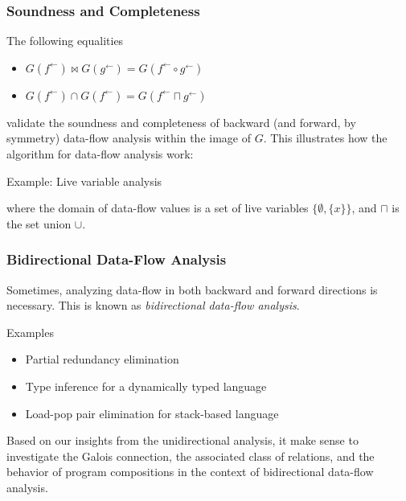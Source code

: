 \documentclass{beamer}
\newcommand{\fb}{{f^{\leftarrow}}}
\newcommand{\gb}{{g^{\leftarrow}}}
\newcommand{\meet}{\sqcap}
\newcommand{\comp}{\circ}
\begin{document}
\begin{frame}
  \frametitle{Soundness and Completeness}
  The following equalities
  \begin{itemize}
    \item $G(\fb) \bowtie G(\gb) = G(\fb \comp \gb)$
    \item $G(\fb) \cap G(\fb) = G(\fb \meet \gb)$
  \end{itemize}
  validate the soundness and completeness of backward (and forward, by symmetry) data-flow analysis within the image of $G$.  This illustrates how the algorithm for data-flow analysis work:
  \begin{block}{Example: Live variable analysis}
   \begin{center}
  \end{center}
  \end{block}
  where the domain of data-flow values is a set of live variables $\{\emptyset, \{ x \}\}$, and $\meet$ is the set union $\cup$.
\end{frame}

\begin{frame}
  \frametitle{Bidirectional Data-Flow Analysis}
  Sometimes, analyzing data-flow in both backward and forward directions is necessary. This is known as \emph{bidirectional data-flow analysis}.
  \begin{block}{Examples}
  \begin{itemize}
    \item Partial redundancy elimination
    \item Type inference for a dynamically typed language
    \item Load-pop pair elimination for stack-based language
  \end{itemize}
  \end{block}
  Based on our insights from the unidirectional analysis, it make sense to investigate the Galois connection, the associated class of relations, and the behavior of program compositions in the context of bidirectional data-flow analysis.
\end{frame}
\end{document}
